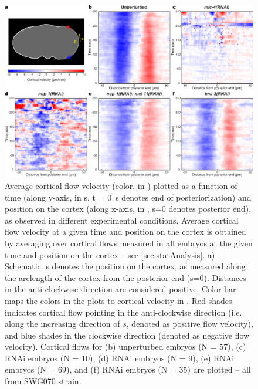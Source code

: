 \begin{figure}
\centering
\includegraphics[width=\textwidth]{Results/FigExpCorticalFlows/crtxFlowTime.pdf}
\caption[Comparing cortical flows between different experimental conditions vs time]{Average cortical flow velocity (color, in \si{\unitCrtxVel}) plotted as a function of time (along y-axis, in \si{\second}, t = \SI{0}{\second} denotes end of posteriorization) and position on the cortex (along x-axis, in \si{\unitLength}, s=\SI{0}{\unitLength} denotes posterior end), as observed in different experimental conditions. Average cortical flow velocity at a given time and position on the cortex is obtained by averaging over cortical flows measured in all embryos at the given time and position on the cortex -- see \autoref{sec:statAnalysis}. a) Schematic. s denotes the position on the cortex, as measured along the arclength of the cortex from the posterior end (s=\SI{0}{\unitLength}). Distances in the anti-clockwise direction are considered positive. Color bar maps the colors in the plots to cortical velocity in \si{\unitCrtxVel}. Red shades indicates cortical flow pointing in the anti-clockwise direction (i.e. along the increasing direction of $s$, denoted as positive flow velocity), and blue shades in the clockwise direction (denoted as negative flow velocity). Cortical flows for (b) unperturbed embryos (N = 57), (c)  RNAi embryos  (N = 10), (d)  RNAi embryos  (N = 9), (e)  RNAi embryos  (N = 69), and (f)  RNAi embryos (N = 35) are plotted -- all from SWG070 strain.}
\label{fig:resultsCorticalAvgFlowVsTime}
\end{figure}

